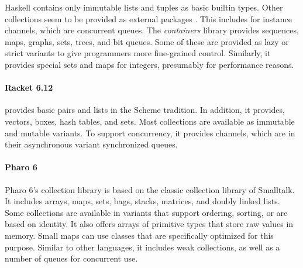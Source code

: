 \documentclass[sigconf, 10pt]{acmart}
\begin{document}

Haskell contains only immutable lists and tuples as basic builtin types.
Other collections seem to be provided as external packages .
This includes for instance channels, which are concurrent queues.
The \emph{containers} library provides
sequences, maps, graphs, sets, trees, and bit queues.
Some of these are provided as lazy or strict variants
to give programmers more fine-grained control.
Similarly, it provides special sets and maps for integers,
presumably for performance reasons.


\paragraph{Racket 6.12}

 provides basic pairs and lists in the Scheme tradition.
In addition, it provides, vectors, boxes, hash tables, and sets.
Most collections are available as immutable and mutable variants.
To support concurrency, it provides channels,
which are in their asynchronous variant synchronized queues.

\paragraph{Pharo 6}
Pharo 6's collection library is based on the classic collection library
of Smalltalk\citep{Smalltalk80,Cook:1992:ISS}.
It includes arrays, maps, sets, bags, stacks, matrices, and doubly linked lists.
Some collections are available in variants that support ordering, sorting,
or are based on identity.
It also offers arrays of primitive types that store raw values in memory.
Small maps can use classes that are specifically optimized for this purpose.
Similar to other languages,
it includes weak collections, as well as a number of queues for concurrent use.
\end{document}
